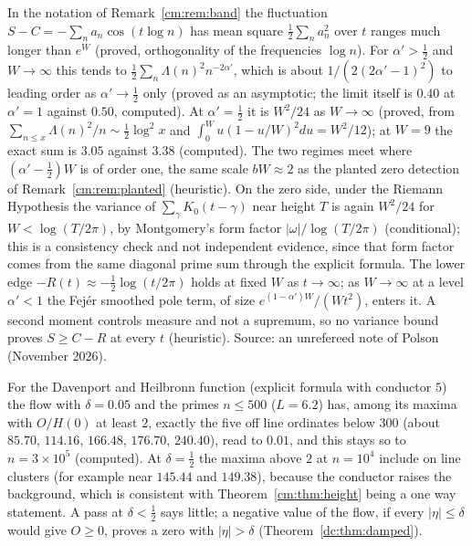 \begin{remark}\label{cm:rem:ladder}
In the notation of Remark~\ref{cm:rem:band} the fluctuation $S-C=-\sum_na_n\cos(t\log n)$ has mean square $\frac12\sum_na_n^2$ over $t$ ranges much longer than $e^W$ (proved, orthogonality of the frequencies $\log n$). For $\alpha'>\frac12$ and $W\to\infty$ this tends to $\frac12\sum_n\Lambda(n)^2n^{-2\alpha'}$, which is about $1/(2(2\alpha'-1)^2)$ to leading order as $\alpha'\to\frac12$ only (proved as an asymptotic; the limit itself is $0.40$ at $\alpha'=1$ against $0.50$, computed). At $\alpha'=\frac12$ it is $W^2/24$ as $W\to\infty$ (proved, from $\sum_{n\le x}\Lambda(n)^2/n\sim\frac12\log^2x$ and $\int_0^Wu(1-u/W)^2du=W^2/12$); at $W=9$ the exact sum is $3.05$ against $3.38$ (computed). The two regimes meet where $(\alpha'-\frac12)W$ is of order one, the same scale $bW\approx2$ as the planted zero detection of Remark~\ref{cm:rem:planted} (heuristic). On the zero side, under the Riemann Hypothesis the variance of $\sum_\gamma K_0(t-\gamma)$ near height $T$ is again $W^2/24$ for $W<\log(T/2\pi)$, by Montgomery's form factor $|\omega|/\log(T/2\pi)$ \cite{Montgomery73} (conditional); this is a consistency check and not independent evidence, since that form factor comes from the same diagonal prime sum through the explicit formula. The lower edge $-R(t)\approx-\frac12\log(t/2\pi)$ holds at fixed $W$ as $t\to\infty$; as $W\to\infty$ at a level $\alpha'<1$ the Fej\'er smoothed pole term, of size $e^{(1-\alpha')W}/(Wt^2)$, enters it. A second moment controls measure and not a supremum, so no variance bound proves $S\ge C-R$ at every $t$ (heuristic). Source: an unrefereed note of Polson (November 2026).
\end{remark}

\begin{remark}[control]\label{cm:rem:dh}
For the Davenport and Heilbronn function (explicit formula with conductor $5$) the flow with $\delta=0.05$ and the primes $n\le500$ ($L=6.2$) has, among its maxima with $O/H(0)$ at least $2$, exactly the five off line ordinates below $300$ (about $85.70$, $114.16$, $166.48$, $176.70$, $240.40$), read to $0.01$, and this stays so to $n=3\times10^5$ (computed). At $\delta=\frac12$ the maxima above $2$ at $n=10^4$ include on line clusters (for example near $145.44$ and $149.38$), because the conductor raises the background, which is consistent with Theorem~\ref{cm:thm:height} being a one way statement. A pass at $\delta<\frac12$ says little; a negative value of the flow, if every $|\eta|\le\delta$ would give $O\ge0$, proves a zero with $|\eta|>\delta$ (Theorem~\ref{dc:thm:damped}).
\end{remark}

